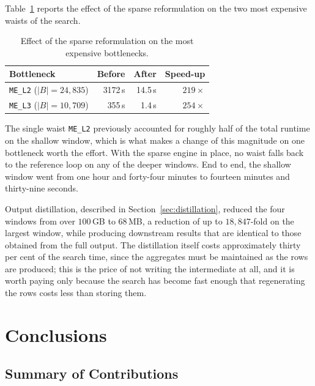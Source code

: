 \documentclass[12pt,a4paper,oneside]{article}
\theoremstyle{definition}
\theoremstyle{plain}
\newcommand{\code}[1]{\texttt{#1}}
\begin{document}
Table~\ref{tab:performance} reports the effect of the sparse reformulation
on the two most expensive waists of the search.

\begin{table}[H]
\centering
\caption{Effect of the sparse reformulation on the most expensive
bottlenecks.}
\label{tab:performance}
\begin{tabular}{lrrr}
\toprule
Bottleneck & Before & After & Speed-up \\
\midrule
\code{ME\_L2} ($|B| = 24{,}835$) & 3172\,s & 14.5\,s & $219\times$ \\
\code{ME\_L3} ($|B| = 10{,}709$) & 355\,s  & 1.4\,s  & $254\times$ \\
\bottomrule
\end{tabular}
\end{table}

The single waist \code{ME\_L2} previously accounted for roughly half of the
total runtime on the shallow window, which is what makes a change of this
magnitude on one bottleneck worth the effort. With the sparse engine in
place, no waist falls back to the reference loop on any of the deeper
windows. End to end, the shallow window went from one hour and forty-four
minutes to fourteen minutes and thirty-nine seconds.

Output distillation, described in Section~\ref{sec:distillation}, reduced
the four windows from over $100$\,GB to $68$\,MB, a reduction of up to
$18{,}847$-fold on the largest window, while producing downstream results
that are identical to those obtained from the full output. The distillation
itself costs approximately thirty per cent of the search time, since the
aggregates must be maintained as the rows are produced; this is the price of
not writing the intermediate at all, and it is worth paying only because the
search has become fast enough that regenerating the rows costs less than
storing them.

\section{Conclusions}
\label{sec:conclusions}

\subsection{Summary of Contributions}
\end{document}
